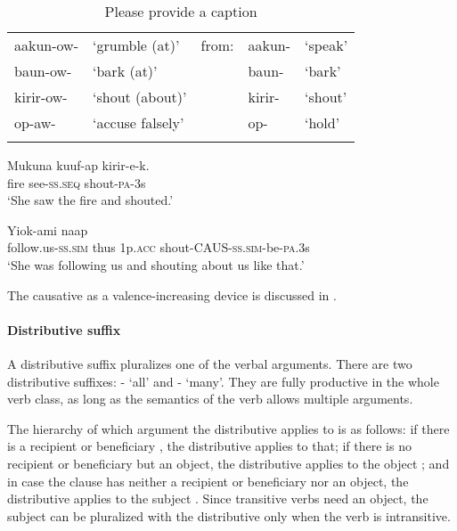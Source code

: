 \begin{table}
\caption{Please provide a caption}
\label{} 
\begin{tabular}{lllll}
\mytoprule
aakun-ow- &`grumble (at)' &from: &aakun- &`speak'\\
baun-ow- &`bark (at)' & &baun- &`bark'\\
kirir-ow- &`shout (about)' & &kirir- &`shout'\\
op-aw- &`accuse falsely' & &op- &`hold'\\
\mybottomrule
\end{tabular} 

\end{table}

\ea%
\label{ex:3:x991}
\gll Mukuna kuuf-ap kirir-e-k. \\
fire see-\textsc{ss}.\textsc{seq} shout-\textsc{pa}-3s\\
\glt`She saw the fire and shouted.'
\z

\ea%
\label{ex:3:x489}
\gll Yiok-ami naap   \\
follow.us-\textsc{ss}.\textsc{sim} thus 1p.\textsc{acc} shout-CAUS-\textsc{ss}.\textsc{sim}-be-\textsc{pa}.3s\\
\glt`She was following us and shouting about us like that.'
\z

The causative as a valence-increasing device is discussed in . 

\paragraph{Distributive suffix}\label{sec:3:a:z:y:x}
{}
A distributive suffix pluralizes one of the verbal arguments. There are two distributive suffixes: \nobreakdash- `all' and \nobreakdash- `many'. They are fully productive in the whole verb class, as long as the semantics of the verb allows multiple arguments. 

The hierarchy of which argument the distributive applies to is as follows: if there is a recipient  or beneficiary , the distributive applies to that; if there is no recipient or beneficiary but an object, the distributive applies to the object ; and in case the clause has neither a recipient or beneficiary nor an object, the distributive applies to the subject . Since transitive verbs need an object, the subject can be pluralized with the distributive only when the verb is intransitive.

